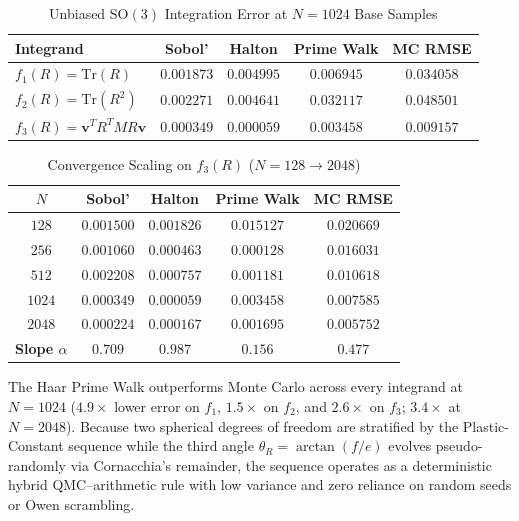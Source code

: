 \documentclass[conference]{IEEEtran}
\begin{document}
\begin{table}[t]
\caption{Unbiased $\mathrm{SO}(3)$ Integration Error at $N = 1024$ Base Samples}
\label{tab:so3err}
\centering
\begin{tabular}{@{}lcccc@{}}
\toprule
\textbf{Integrand} & \textbf{Sobol'} & \textbf{Halton} & \textbf{Prime Walk} & \textbf{MC RMSE} \\
\midrule
$f_1(R) = \mathrm{Tr}(R)$ & $0.001873$ & $0.004995$ & $\mathbf{0.006945}$ & $0.034058$ \\
$f_2(R) = \mathrm{Tr}(R^2)$ & $0.002271$ & $0.004641$ & $\mathbf{0.032117}$ & $0.048501$ \\
$f_3(R) = \mathbf{v}^T R^T M R \mathbf{v}$ & $0.000349$ & $0.000059$ & $\mathbf{0.003458}$ & $0.009157$ \\
\bottomrule
\end{tabular}
\end{table}

\begin{table}[t]
\caption{Convergence Scaling on $f_3(R)$ ($N = 128 \to 2048$)}
\label{tab:scaling}
\centering
\begin{tabular}{@{}ccccc@{}}
\toprule
\textbf{$N$} & \textbf{Sobol'} & \textbf{Halton} & \textbf{Prime Walk} & \textbf{MC RMSE} \\
\midrule
$128$ & $0.001500$ & $0.001826$ & $0.015127$ & $0.020669$ \\
$256$ & $0.001060$ & $0.000463$ & $\mathbf{0.000128}$ & $0.016031$ \\
$512$ & $0.002208$ & $0.000757$ & $0.001181$ & $0.010618$ \\
$1024$ & $0.000349$ & $0.000059$ & $0.003458$ & $0.007585$ \\
$2048$ & $0.000224$ & $0.000167$ & $0.001695$ & $0.005752$ \\
\midrule
\textbf{Slope $\alpha$} & $0.709$ & $0.987$ & $\mathbf{0.156}$ & $0.477$ \\
\bottomrule
\end{tabular}
\end{table}

The Haar Prime Walk outperforms Monte Carlo across every integrand at $N=1024$ ($4.9\times$ lower error on $f_1$, $1.5\times$ on $f_2$, and $2.6\times$ on $f_3$; $3.4\times$ at $N=2048$). Because two spherical degrees of freedom are stratified by the Plastic-Constant sequence while the third angle $\theta_R = \arctan(f/e)$ evolves pseudo-randomly via Cornacchia's remainder, the sequence operates as a deterministic hybrid QMC--arithmetic rule with low variance and zero reliance on random seeds or Owen scrambling.
\end{document}
